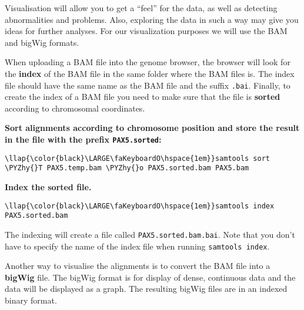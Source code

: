 \documentclass[11pt]{article}
\def\PYZhy{\char`\-}
\begin{document}
Visualisation will allow you to get a ``feel'' for the data, as well as
detecting abnormalities and problems. Also, exploring the data in such a
way may give you ideas for further analyses. For our visualization
purposes we will use the BAM and bigWig formats.

When uploading a BAM file into the genome browser, the browser will look
for the \textbf{index} of the BAM file in the same folder where the BAM
files is. The index file should have the same name as the BAM file and
the suffix \texttt{.bai}. Finally, to create the index of a BAM file you
need to make sure that the file is \textbf{sorted} according to
chromosomal coordinates.

    \textbf{Sort alignments according to chromosome position and store the
result in the file with the prefix \texttt{PAX5.sorted}:}





\begin{terminalinput}
\begin{Verbatim}[commandchars=\\\{\}]
\llap{\color{black}\LARGE\faKeyboardO\hspace{1em}}samtools sort \PYZhy{}T PAX5.temp.bam \PYZhy{}o PAX5.sorted.bam PAX5.bam
\end{Verbatim}
\end{terminalinput}



    \textbf{Index the sorted file.}





\begin{terminalinput}
\begin{Verbatim}[commandchars=\\\{\}]
\llap{\color{black}\LARGE\faKeyboardO\hspace{1em}}samtools index PAX5.sorted.bam
\end{Verbatim}
\end{terminalinput}



    The indexing will create a file called \texttt{PAX5.sorted.bam.bai}.
Note that you don't have to specify the name of the index file when
running \texttt{samtools\ index}.

Another way to visualise the alignments is to convert the BAM file into
a \textbf{bigWig} file. The bigWig format is for display of dense,
continuous data and the data will be displayed as a graph. The resulting
bigWig files are in an indexed binary format.
\end{document}
